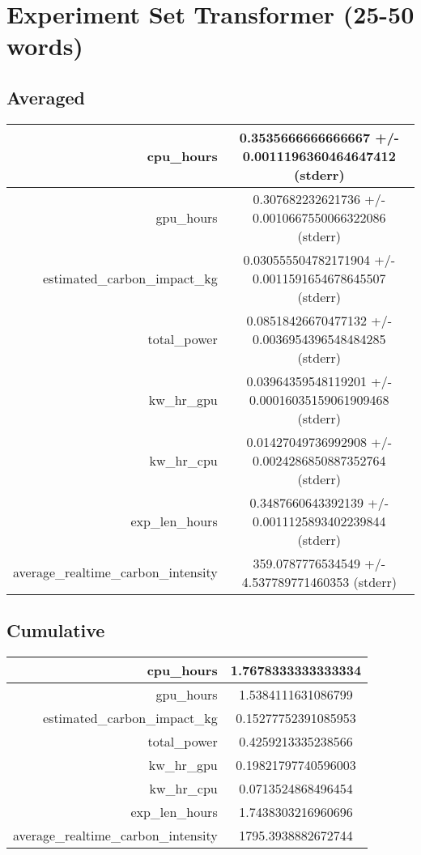 \documentclass{article}%
\begin{document}
%
\normalsize%
\section{Experiment Set Transformer (25{-}50 words)}%
\label{sec:Experiment Set Transformer (25{-}50 words)}%
\subsection{Averaged}%
\label{subsec:Averaged}%
\begin{tabular}{|r|c|}%
\hline%
cpu\_hours&0.3535666666666667 +/{-} 0.0011196360464647412 (stderr)\\%
\hline%
gpu\_hours&0.307682232621736 +/{-} 0.0010667550066322086 (stderr)\\%
\hline%
estimated\_carbon\_impact\_kg&0.030555504782171904 +/{-} 0.0011591654678645507 (stderr)\\%
\hline%
total\_power&0.08518426670477132 +/{-} 0.0036954396548484285 (stderr)\\%
\hline%
kw\_hr\_gpu&0.03964359548119201 +/{-} 0.00016035159061909468 (stderr)\\%
\hline%
kw\_hr\_cpu&0.01427049736992908 +/{-} 0.0024286850887352764 (stderr)\\%
\hline%
exp\_len\_hours&0.3487660643392139 +/{-} 0.0011125893402239844 (stderr)\\%
\hline%
average\_realtime\_carbon\_intensity&359.0787776534549 +/{-} 4.537789771460353 (stderr)\\%
\hline%
\end{tabular}

%
\subsection{Cumulative}%
\label{subsec:Cumulative}%
\begin{tabular}{|r|c|}%
\hline%
cpu\_hours&1.7678333333333334\\%
\hline%
gpu\_hours&1.5384111631086799\\%
\hline%
estimated\_carbon\_impact\_kg&0.15277752391085953\\%
\hline%
total\_power&0.4259213335238566\\%
\hline%
kw\_hr\_gpu&0.19821797740596003\\%
\hline%
kw\_hr\_cpu&0.0713524868496454\\%
\hline%
exp\_len\_hours&1.7438303216960696\\%
\hline%
average\_realtime\_carbon\_intensity&1795.3938882672744\\%
\hline%
\end{tabular}

%
\end{document}
